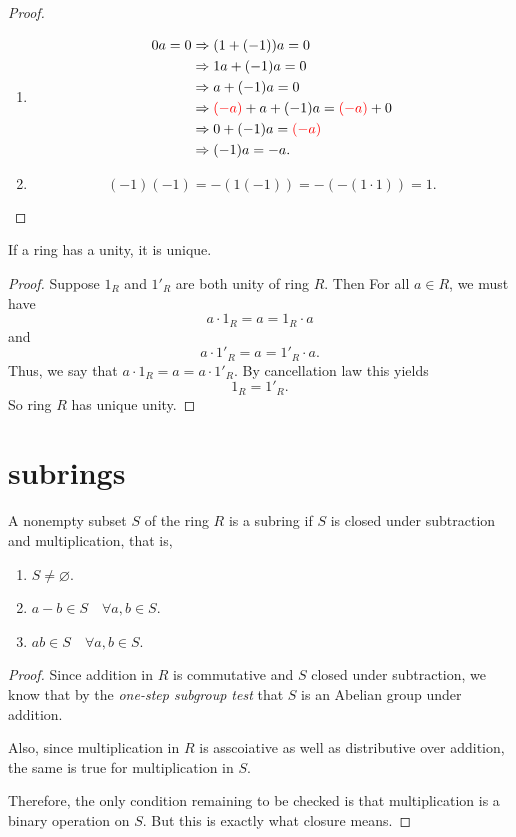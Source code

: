 \begin{proof}
\begin{enumerate}
        \item \begin{align*}
            0a = 0 &\Rightarrow (1+(-1))a = 0\\
            &\Rightarrow 1a + (-1)a = 0\\
            &\Rightarrow a + (-1)a = 0\\
            &\Rightarrow {\color{red}{} (-a)} + a + (-1)a = {\color{red}{} (-a)} + 0\\
            &\Rightarrow 0 + (-1)a =  {\color{red}{} (-a)}\\
            &\Rightarrow (-1)a = -a.
        \end{align*}

        \item \[
            (-1)(-1) = -(1(-1)) = -(-(1 \cdot 1)) = 1.
        \]
    \end{enumerate}
\end{proof}

\begin{lemma}
    If a ring has a unity, it is unique.
\end{lemma}
\begin{proof}
    Suppose $1_R$ and $1'_R$ are both unity of ring $R$. Then 
    For all $a \in R$, we must have 
    \[
        a \cdot 1_R = a = 1_R \cdot a
    \]
    and 
    \[
        a \cdot 1'_R = a = 1'_R \cdot a.
    \]
    Thus, we say that $a \cdot 1_R = a = a \cdot 1'_R$. By cancellation law this yields
    \[
        1_R = 1'_R.
    \]
    So ring $R$ has unique unity.
\end{proof}

\section{subrings}

\begin{theorem}
    A nonempty subset $S$ of the ring $R$ is a subring if $S$ is closed under subtraction and multiplication, that is,
    \begin{enumerate}
        \item $S \neq \varnothing$.
        \item $a - b \in S \quad \forall a, b \in S$.
        \item $ab \in S \quad \forall a, b \in S$.
    \end{enumerate}
\end{theorem}
\begin{proof}
    Since addition in $R$ is commutative and $S$ closed under subtraction, we know that by 
    the \textit{one-step subgroup test} that $S$ is an Abelian group under addition. 
    
    Also, since multiplication in $R$ is asscoiative as well as distributive over addition, the 
    same is true for multiplication in $S$.

    Therefore, the only condition remaining to be checked is that multiplication is a binary 
    operation on $S$. But this is exactly what closure means.
\end{proof}

